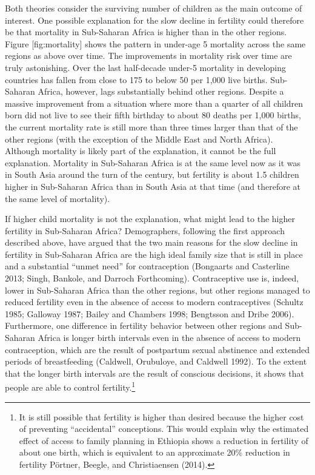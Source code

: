 \documentclass[]{article}
\begin{document}
Both theories consider the surviving number of children as the main outcome of interest. One possible explanation for the slow decline in fertility could therefore be that mortality in Sub-Saharan Africa is higher than in the other regions. Figure {[}fig:mortality{]} shows the pattern in under-age 5 mortality across the same regions as above over time. The improvements in mortality risk over time are truly astonishing. Over the last half-decade under-5 mortality in developing countries has fallen from close to 175 to below 50 per 1,000 live births. Sub-Saharan Africa, however, lags substantially behind other regions. Despite a massive improvement from a situation where more than a quarter of all children born did not live to see their fifth birthday to about 80 deaths per 1,000 births, the current mortality rate is still more than three times larger than that of the other regions (with the exception of the Middle East and North Africa). Although mortality is likely part of the explanation, it cannot be the full explanation. Mortality in Sub-Saharan Africa is at the same level now as it was in South Asia around the turn of the century, but fertility is about 1.5 children higher in Sub-Saharan Africa than in South Asia at that time (and therefore at the same level of mortality).

If higher child mortality is not the explanation, what might lead to the higher fertility in Sub-Saharan Africa? Demographers, following the first approach described above, have argued that the two main reasons for the slow decline in fertility in Sub-Saharan Africa are the high ideal family size that is still in place and a substantial ``unmet need'' for contraception (Bongaarts and Casterline 2013; Singh, Bankole, and Darroch Forthcoming). Contraceptive use is, indeed, lower in Sub-Saharan Africa than the other regions, but other regions managed to reduced fertility even in the absence of access to modern contraceptives (Schultz 1985; Galloway 1987; Bailey and Chambers 1998; Bengtsson and Dribe 2006). Furthermore, one difference in fertility behavior between other regions and Sub-Saharan Africa is longer birth intervals even in the absence of access to modern contraception, which are the result of postpartum sexual abstinence and extended periods of breastfeeding (Caldwell, Orubuloye, and Caldwell 1992). To the extent that the longer birth intervals are the result of conscious decisions, it shows that people are able to control fertility.\footnote{It is still possible that fertility is higher than desired because the higher cost of preventing ``accidental'' conceptions. This would explain why the estimated effect of access to family planning in Ethiopia shows a reduction in fertility of about one birth, which is equivalent to an approximate 20\% reduction in fertility Pörtner, Beegle, and Christiaensen (2014).}
\end{document}
